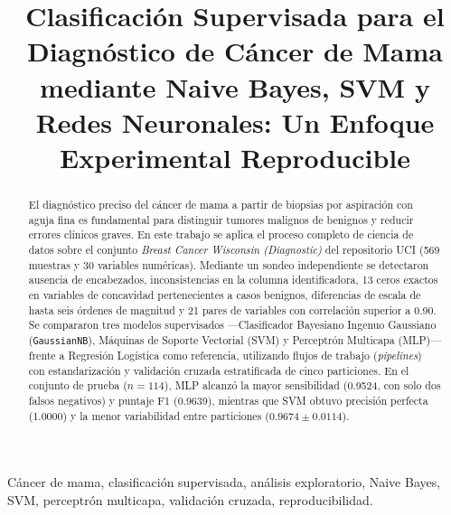 \documentclass[conference]{IEEEtran}
\begin{document}
\title{Clasificación Supervisada para el Diagnóstico de Cáncer de Mama mediante Naive Bayes, SVM y Redes Neuronales: Un Enfoque Experimental Reproducible}

\author{
}

\maketitle

\begin{abstract}
El diagnóstico preciso del cáncer de mama a partir de biopsias por aspiración con aguja fina es fundamental para distinguir tumores malignos de benignos y reducir errores clínicos graves. En este trabajo se aplica el proceso completo de ciencia de datos sobre el conjunto \textit{Breast Cancer Wisconsin (Diagnostic)} del repositorio UCI (569 muestras y 30 variables numéricas). Mediante un sondeo independiente se detectaron ausencia de encabezados, inconsistencias en la columna identificadora, 13 ceros exactos en variables de concavidad pertenecientes a casos benignos, diferencias de escala de hasta seis órdenes de magnitud y 21 pares de variables con correlación superior a 0.90. Se compararon tres modelos supervisados ---Clasificador Bayesiano Ingenuo Gaussiano (\texttt{GaussianNB}), Máquinas de Soporte Vectorial (SVM) y Perceptrón Multicapa (MLP)--- frente a Regresión Logística como referencia, utilizando flujos de trabajo (\textit{pipelines}) con estandarización y validación cruzada estratificada de cinco particiones. En el conjunto de prueba ($n = 114$), MLP alcanzó la mayor sensibilidad (0.9524, con solo dos falsos negativos) y puntaje F1 (0.9639), mientras que SVM obtuvo precisión perfecta (1.0000) y la menor variabilidad entre particiones ($0.9674 \pm 0.0114$).
\end{abstract}

\begin{IEEEkeywords}
Cáncer de mama, clasificación supervisada, análisis exploratorio, Naive Bayes, SVM, perceptrón multicapa, validación cruzada, reproducibilidad.
\end{IEEEkeywords}
\end{document}
